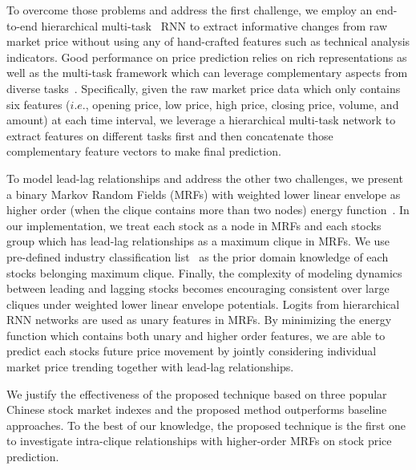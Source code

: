 \documentclass[sigconf]{acmart}
\renewcommand{\citename}{\citet}
\renewcommand{\cite}{\citep}
\begin{document}
To overcome those problems and address the first challenge, we employ an end-to-end
hierarchical multi-task~\cite{caruana1993multitask} RNN to
extract informative changes from raw market price without using
any of hand-crafted features such as technical analysis
indicators. Good performance on price prediction relies on rich
representations as well as the multi-task framework which can leverage
complementary aspects from diverse tasks~\cite{sogaard2016deep}. Specifically, given the raw market price data which only contains six features ($i.e.$, opening
price, low price, high price, closing price, volume, and amount) at each time interval, we leverage a hierarchical multi-task
network to extract features on different tasks first and then concatenate those complementary feature vectors to make final prediction.

To model lead-lag relationships and address the other two challenges, we present a
binary Markov Random Fields (MRFs) with weighted lower linear envelope as higher order (when the clique contains more than two
nodes) energy function~\cite{Kohli:CVPR07,Nowozin:2011,Gould:ICML2011,gouldlearning}.
In our implementation, we treat each stock as a node in MRFs and each stocks group which has lead-lag relationships as a maximum clique in MRFs. We use pre-defined industry classification
list~\cite{ths} as the prior domain knowledge of each stock\textquotesingle s belonging maximum clique. Finally, the
complexity of modeling dynamics between leading and lagging stocks becomes encouraging consistent over large cliques under
weighted lower linear envelope potentials. Logits from hierarchical RNN networks are used as unary features in MRFs. By minimizing the energy function which contains both unary and higher order
features, we are able to predict each stock\textquotesingle s future price movement by jointly considering individual market
price trending together with lead-lag relationships.

We justify the effectiveness of the proposed technique based on three popular Chinese stock market indexes and the proposed method outperforms baseline approaches. To the best of our knowledge, the proposed technique is the first one to investigate intra-clique relationships with higher-order MRFs on stock price prediction.
  
\end{document}
